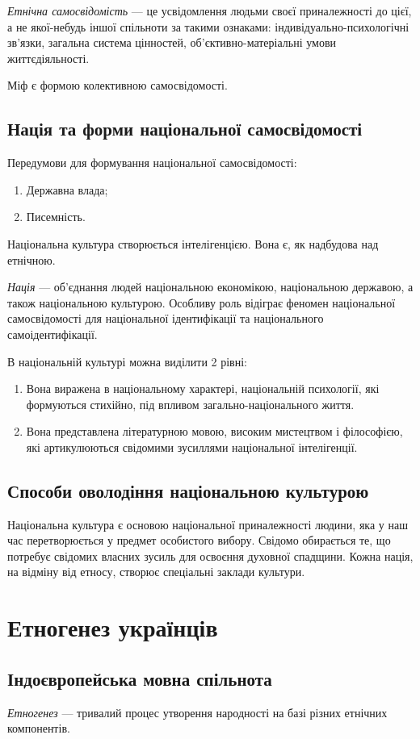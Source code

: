 \documentclass[a5paper,10pt,titlepage,pdftex,headsepline]{scrartcl}
\begin{document}
\textit{Етнічна самосвідомість} --- це усвідомлення людьми своєї приналежності до цієї, а не якої-небудь іншої спільноти за такими ознаками: індивідуально-психологічні зв’язки, загальна система цінностей, об’єктивно-матеріальні умови життєдіяльності.

Міф є формою колективною самосвідомості.
\subsection{Нація та форми національної самосвідомості}
Передумови для формування національної самосвідомості:
\begin{enumerate}
	\item Державна влада;
	\item Писемність.
\end{enumerate}

Національна культура створюється інтелігенцією.
Вона є, як надбудова над етнічною.

\textit{Нація} --- об’єднання людей національною економікою, національною державою, а також національною культурою.
Особливу роль відіграє феномен національної самосвідомості для національної ідентифікації та національного самоідентифікації.

В національній культурі можна виділити 2 рівні:
\begin{enumerate}
	\item Вона виражена в національному характері, національній психології, які формуються стихійно, під впливом загально-національного життя.
	\item Вона представлена літературною мовою, високим мистецтвом і філософією, які артикулюються свідомими зусиллями національної інтелігенції.
\end{enumerate}
\subsection{Способи оволодіння національною культурою}
Національна культура є основою національної приналежності людини, яка у наш час перетворюється у предмет особистого вибору.
Свідомо обирається те, що потребує свідомих власних зусиль для освоєння духовної спадщини.
Кожна нація, на відміну від етносу, створює спеціальні заклади культури.
\section{Етногенез українців}
\subsection{Індоєвропейська мовна спільнота}
\textit{Етногенез} --- тривалий процес утворення народності на базі різних етнічних компонентів.
\end{document}

